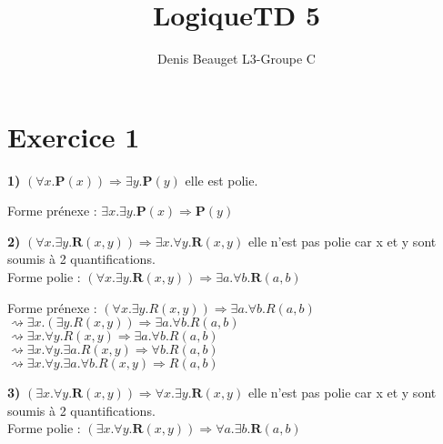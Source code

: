 \documentclass{article}
\title{LogiqueTD 5}
\author{Denis Beauget L3-Groupe C}
\begin{document}
\maketitle

\section*{Exercice 1}

\textbf{1)} $(\forall x.\textbf{P}(x)) \Rightarrow \exists y.\textbf{P}(y)$    elle est polie.


Forme prénexe :
\vspace{0.1cm}
$\exists x.\exists y.  \textbf{P}(x) \Rightarrow \textbf{P}(y)$

\vspace{0.5cm}
\textbf{2)} $(\forall x. \exists y. \textbf{R}(x,y)) \Rightarrow \exists x. \forall y. \textbf{R}(x,y)$ elle n'est pas polie car x et y sont soumis à 2 quantifications.
\\

Forme polie : 
\vspace{0.1cm}
 $(\forall x. \exists y. \textbf{R}(x,y)) \Rightarrow \exists a. \forall b. \textbf{R}(a,b)$

Forme prénexe :
\vspace{0.1cm}
$(\forall x.\exists y.R(x,y))\Rightarrow \exists a.\forall b.R(a,b)$\\

$\rightsquigarrow \exists x.(\exists y.R(x,y))\Rightarrow \exists a.\forall b.R(a,b)$\\

$\rightsquigarrow \exists x.\forall y.R(x,y)\Rightarrow \exists a.\forall b.R(a,b)$\\

$\rightsquigarrow \exists x.\forall y.\exists a.R(x,y)\Rightarrow \forall b.R(a,b)$\\

$\rightsquigarrow \exists x.\forall y.\exists a.\forall b.R(x,y)\Rightarrow R(a,b)$

\vspace{0.5cm}
\textbf{3)} $(\exists x. \forall y. \textbf{R}(x,y)) \Rightarrow \forall x. \exists y. \textbf{R}(x,y)$ elle n'est pas polie car x et y sont soumis à 2 quantifications.
\\


Forme polie :
\vspace{0.1cm}
$(\exists x. \forall y. \textbf{R}(x,y))
\Rightarrow \forall a. \exists b. \textbf{R}(a,b)$ 
\end{document}
